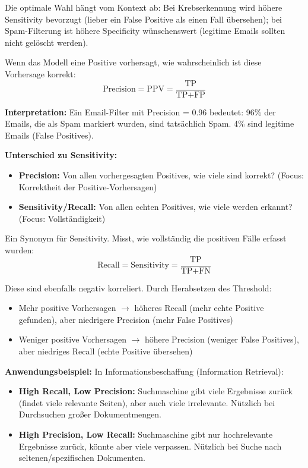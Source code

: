 Die optimale Wahl hängt vom Kontext ab: Bei Krebserkennung wird höhere Sensitivity bevorzugt (lieber ein False Positive als einen Fall übersehen); bei Spam-Filterung ist höhere Specificity wünschenswert (legitime Emails sollten nicht gelöscht werden).

Wenn das Modell eine Positive vorhersagt, wie wahrscheinlich ist diese Vorhersage korrekt:
$$\text{Precision} = \text{PPV} = \frac{\text{TP}}{\text{TP} + \text{FP}}$$

\textbf{Interpretation:} Ein Email-Filter mit Precision = 0.96 bedeutet: 96\% der Emails, die als Spam markiert wurden, sind tatsächlich Spam. 4\% sind legitime Emails (False Positives).

\textbf{Unterschied zu Sensitivity:}
\begin{itemize}[leftmargin=1.5em]
    \item \textbf{Precision:} Von allen vorhergesagten Positives, wie viele sind korrekt? (Focus: Korrektheit der Positive-Vorhersagen)
    \item \textbf{Sensitivity/Recall:} Von allen echten Positives, wie viele werden erkannt? (Focus: Vollständigkeit)
\end{itemize}

Ein Synonym für Sensitivity. Misst, wie vollständig die positiven Fälle erfasst wurden:
$$\text{Recall} = \text{Sensitivity} = \frac{\text{TP}}{\text{TP} + \text{FN}}$$

Diese sind ebenfalls negativ korreliert. Durch Herabsetzen des Threshold:
\begin{itemize}[leftmargin=1.5em]
    \item Mehr positive Vorhersagen $\to$ höheres Recall (mehr echte Positive gefunden), aber niedrigere Precision (mehr False Positives)
    \item Weniger positive Vorhersagen $\to$ höhere Precision (weniger False Positives), aber niedriges Recall (echte Positive übersehen)
\end{itemize}

\textbf{Anwendungsbeispiel:} In Informationsbeschaffung (Information Retrieval):
\begin{itemize}[leftmargin=1.5em]
    \item \textbf{High Recall, Low Precision:} Suchmaschine gibt viele Ergebnisse zurück (findet viele relevante Seiten), aber auch viele irrelevante. Nützlich bei Durchsuchen großer Dokumentmengen.
    \item \textbf{High Precision, Low Recall:} Suchmaschine gibt nur hochrelevante Ergebnisse zurück, könnte aber viele verpassen. Nützlich bei Suche nach seltenen/spezifischen Dokumenten.
\end{itemize}

